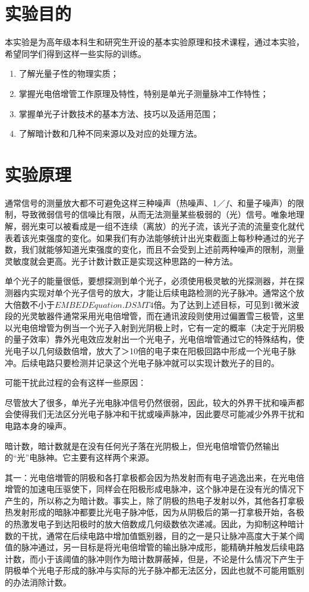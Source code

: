 \documentclass[UTF8]{ctexart}
\begin{document}
\section{实验目的}
本实验是为高年级本科生和研究生开设的基本实验原理和技术课程，通过本实验，希望同学们得到这样一些实际的训练。
\begin{enumerate}
	\item 了解光量子性的物理实质；
	\item 掌握光电倍增管工作原理及特性，特别是单光子测量脉冲工作特性；
	\item 掌握单光子计数技术的基本方法、技巧以及适用范围；
	\item 了解暗计数和几种不同来源以及对应的处理方法。
\end{enumerate}
\section{实验原理}
通常信号的测量放大都不可避免这样三种噪声（热噪声、1／$f$、和量子噪声）的限制，导致微弱信号的信噪比有限，从而无法测量某些极弱的（光）信号。唯象地理解，弱光束可以被看成是一组不连续（离放）的光子流，该光子流的流量变化就代表着该光束强度的变化。如果我们有办法能够统计出光束截面上每秒种通过的光子数，我们就能够知道光束强度的变化，而且不会受到上述前两种噪声的限制，测量灵敏度就会更高。光子计数计数正是实现这种思路的一种方法。

单个光子的能量很低，要想探测到单个光子，必须使用极灵敏的光探测器，并在探测器内实现对单个光子信号的放大，才能让后续电路检测的光子脉冲。通常这个放大倍数不小于${EMBED Equation.DSMT4}$倍。为了达到上述目标，可见到1微米波段的光灵敏器件通常采用光电倍增管，而在通讯波段则使用过偏置雪三极管，这里以光电倍增管为例当一个光子入射到光阴极上时，它有一定的概率（决定于光阴极的量子效率）靠外光电效应发射出一个光电子，光电倍增管通过它的特殊结构，使光电子以几何级数倍增，放大了＞10倍的电子束在阳极回路中形成一个光电子脉冲。后续电路只要检测并记录这个光电子脉冲就可以实现计数光子的目的。

可能干扰此过程的会有这样一些原因：

尽管放大了很多，单光子光电脉冲信号仍然很弱，因此，较大的外界干扰和噪声都会使得我们无法区分光电子脉冲和干扰或噪声脉冲，因此要尽可能减少外界干扰和电路本身的噪声。

暗计数，暗计数就是在没有任何光子落在光阴极上，但光电倍增管仍然输出的“光”电脉神。它主要有这样两个来源。

其一：光电倍増管的阴极和各打拿极都会因为热发射而有电子逃逸出来，在光电倍增管的加速电压驱使下，同样会在阳极形成电脉冲，这个脉冲是在没有光的情况下产生的，所以称之为暗计数。事实上，除了阴极的热电子发射以外，其他各打拿极热发射形成的暗脉冲都要比光电子脉冲低，因为从阴极后的第一打拿极开始，各极的热激发电子到达阳极时的放大倍数成几何级数依次递减。因此，为抑制这种暗计数的干扰，通常在后续电路中增加值甑别器，目的之一是只让脉冲高度大于某个阈值的脉冲通过，另一目标是将光电倍增管的输出脉冲成形，能精确并触发后续电路计数，而小于该阈值的脉冲则作为暗计数屏蔽掉，但是，不论是什么情况下产生于阴极单个光电子形成的脉冲与实际的光子脉冲都无法区分，因此也就不可能用甑别的办法消除计数。
\end{document}
